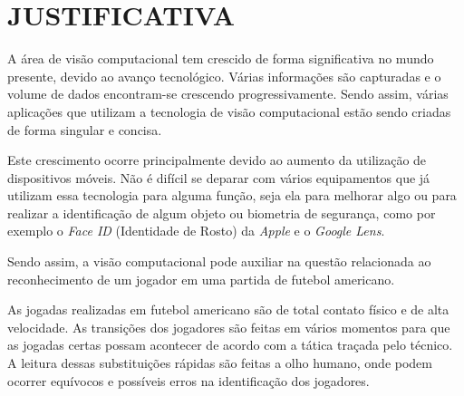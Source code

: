 \chapter{JUSTIFICATIVA}

A área de visão computacional tem crescido de forma significativa no mundo presente, devido ao avanço tecnológico. Várias informações são capturadas e o volume de dados encontram-se crescendo progressivamente. Sendo assim, várias aplicações que utilizam a tecnologia de visão computacional estão sendo criadas de forma singular e concisa.

Este crescimento ocorre principalmente devido ao aumento da utilização de dispositivos móveis. Não é difícil se deparar com vários equipamentos que já utilizam essa tecnologia para alguma função, seja ela para melhorar algo ou para realizar a identificação de algum objeto ou biometria de segurança, como por exemplo o \textit{Face ID} (Identidade de Rosto) da \textit{Apple} e o \textit{Google Lens}.

Sendo assim, a visão computacional pode auxiliar na questão relacionada ao reconhecimento de um jogador em uma partida de futebol americano.

As jogadas realizadas em futebol americano são de total contato físico e de alta velocidade. As transições dos jogadores são feitas em vários momentos para que as jogadas certas possam acontecer de acordo com a tática traçada pelo técnico. A leitura dessas substituições rápidas são feitas a olho humano, onde podem ocorrer equívocos e possíveis erros na identificação dos jogadores.